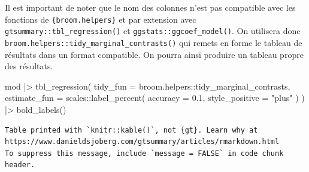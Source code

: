 \documentclass[
  letterpaper,
  DIV=11,
  numbers=noendperiod,
  oneside]{scrreprt}
\newenvironment{Shaded}{\begin{snugshade}}{\end{snugshade}}
\newcommand{\AttributeTok}[1]{\textcolor[rgb]{0.40,0.45,0.13}{#1}}
\newcommand{\FloatTok}[1]{\textcolor[rgb]{0.68,0.00,0.00}{#1}}
\newcommand{\FunctionTok}[1]{\textcolor[rgb]{0.28,0.35,0.67}{#1}}
\newcommand{\NormalTok}[1]{\textcolor[rgb]{0.00,0.23,0.31}{#1}}
\newcommand{\SpecialCharTok}[1]{\textcolor[rgb]{0.37,0.37,0.37}{#1}}
\newcommand{\StringTok}[1]{\textcolor[rgb]{0.13,0.47,0.30}{#1}}
\begin{document}
Il est important de noter que le nom des colonnes n'est pas compatible
avec les fonctions de \texttt{\{broom.helpers\}} et par extension avec
\texttt{gtsummary::tbl\_regression()} et
\texttt{ggstats::ggcoef\_model()}. On utilisera donc
\texttt{broom.helpers::tidy\_marginal\_contrasts()} qui remets en forme le tableau
de résultats dans un format compatible. On pourra ainsi produire un
tableau propre des résultats.

\begin{Shaded}
\begin{Highlighting}[]
\NormalTok{mod }\SpecialCharTok{|\textgreater{}} 
  \FunctionTok{tbl\_regression}\NormalTok{(}
    \AttributeTok{tidy\_fun =}\NormalTok{ broom.helpers}\SpecialCharTok{::}\NormalTok{tidy\_marginal\_contrasts,}
    \AttributeTok{estimate\_fun =}\NormalTok{ scales}\SpecialCharTok{::}\FunctionTok{label\_percent}\NormalTok{(}
      \AttributeTok{accuracy =} \FloatTok{0.1}\NormalTok{,}
      \AttributeTok{style\_positive =} \StringTok{"plus"}
\NormalTok{    )}
\NormalTok{  ) }\SpecialCharTok{|\textgreater{}} 
  \FunctionTok{bold\_labels}\NormalTok{()}
\end{Highlighting}
\end{Shaded}

\begin{verbatim}
Table printed with `knitr::kable()`, not {gt}. Learn why at
https://www.danieldsjoberg.com/gtsummary/articles/rmarkdown.html
To suppress this message, include `message = FALSE` in code chunk header.
\end{verbatim}
\end{document}
